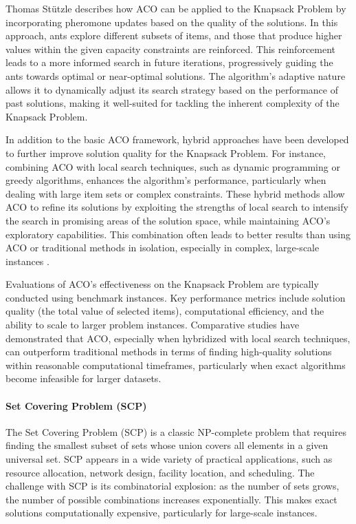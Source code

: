 Thomas Stützle describes how ACO can be applied to the Knapsack Problem by incorporating pheromone updates based on the quality of the solutions\cite{Stutzle2011}. In this approach, ants explore different subsets of items, and those that produce higher values within the given capacity constraints are reinforced. This reinforcement leads to a more informed search in future iterations, progressively guiding the ants towards optimal or near-optimal solutions. The algorithm’s adaptive nature allows it to dynamically adjust its search strategy based on the performance of past solutions, making it well-suited for tackling the inherent complexity of the Knapsack Problem.

In addition to the basic ACO framework, hybrid approaches have been developed to further improve solution quality for the Knapsack Problem. For instance, combining ACO with local search techniques, such as dynamic programming or greedy algorithms, enhances the algorithm's performance, particularly when dealing with large item sets or complex constraints. These hybrid methods allow ACO to refine its solutions by exploiting the strengths of local search to intensify the search in promising areas of the solution space, while maintaining ACO's exploratory capabilities. This combination often leads to better results than using ACO or traditional methods in isolation, especially in complex, large-scale instances \cite{Stutzle2011}.

Evaluations of ACO's effectiveness on the Knapsack Problem are typically conducted using benchmark instances. Key performance metrics include solution quality (the total value of selected items), computational efficiency, and the ability to scale to larger problem instances. Comparative studies have demonstrated that ACO, especially when hybridized with local search techniques, can outperform traditional methods in terms of finding high-quality solutions within reasonable computational timeframes, particularly when exact algorithms become infeasible for larger datasets.

\paragraph{Set Covering Problem (SCP)}
The Set Covering Problem (SCP) is a classic NP-complete problem that requires finding the smallest subset of sets whose union covers all elements in a given universal set. SCP appears in a wide variety of practical applications, such as resource allocation, network design, facility location, and scheduling. The challenge with SCP is its combinatorial explosion: as the number of sets grows, the number of possible combinations increases exponentially. This makes exact solutions computationally expensive, particularly for large-scale instances.

